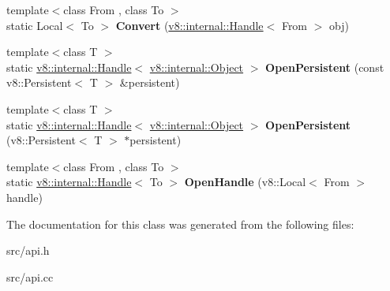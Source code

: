 \begin{DoxyCompactItemize}
\item 
\hypertarget{classv8_1_1_utils_a9c21e61f893500ba01a11df38161f4c7}{}{\footnotesize template$<$class From , class To $>$ }\\static Local$<$ To $>$ {\bfseries Convert} (\hyperlink{classv8_1_1internal_1_1_handle}{v8\+::internal\+::\+Handle}$<$ From $>$ obj)\label{classv8_1_1_utils_a9c21e61f893500ba01a11df38161f4c7}

\item 
\hypertarget{classv8_1_1_utils_a9ab1c52f245ffcabe1335485298ab29c}{}{\footnotesize template$<$class T $>$ }\\static \hyperlink{classv8_1_1internal_1_1_handle}{v8\+::internal\+::\+Handle}$<$ \hyperlink{classv8_1_1internal_1_1_object}{v8\+::internal\+::\+Object} $>$ {\bfseries Open\+Persistent} (const v8\+::\+Persistent$<$ T $>$ \&persistent)\label{classv8_1_1_utils_a9ab1c52f245ffcabe1335485298ab29c}

\item 
\hypertarget{classv8_1_1_utils_a0638ee97beb33d821220b91f47cff4dd}{}{\footnotesize template$<$class T $>$ }\\static \hyperlink{classv8_1_1internal_1_1_handle}{v8\+::internal\+::\+Handle}$<$ \hyperlink{classv8_1_1internal_1_1_object}{v8\+::internal\+::\+Object} $>$ {\bfseries Open\+Persistent} (v8\+::\+Persistent$<$ T $>$ $\ast$persistent)\label{classv8_1_1_utils_a0638ee97beb33d821220b91f47cff4dd}

\item 
\hypertarget{classv8_1_1_utils_a607b2ed012097b00edf6d9cc41ce30b3}{}{\footnotesize template$<$class From , class To $>$ }\\static \hyperlink{classv8_1_1internal_1_1_handle}{v8\+::internal\+::\+Handle}$<$ To $>$ {\bfseries Open\+Handle} (v8\+::\+Local$<$ From $>$ handle)\label{classv8_1_1_utils_a607b2ed012097b00edf6d9cc41ce30b3}

\end{DoxyCompactItemize}


The documentation for this class was generated from the following files\+:\begin{DoxyCompactItemize}
\item 
src/api.\+h\item 
src/api.\+cc\end{DoxyCompactItemize}
